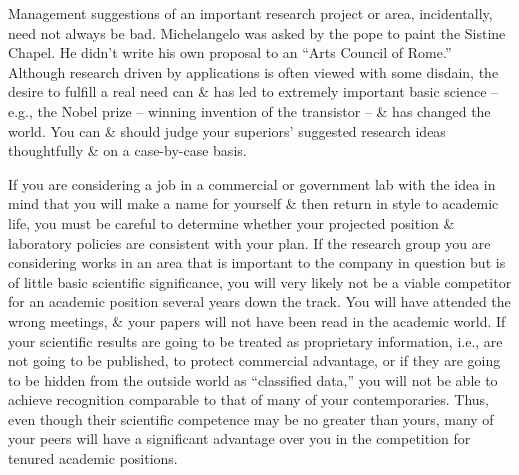 \documentclass{article}
\begin{document}
\begin{enumerate}
\begin{itemize}
\begin{itemize}
			Management suggestions of an important research project or area, incidentally, need not always be bad. Michelangelo was asked by the pope to paint the Sistine Chapel. He didn't write his own proposal to an ``Arts Council of Rome.'' Although research driven by applications is often viewed with some disdain, the desire to fulfill a real need can \& has led to extremely important basic science -- e.g., the Nobel prize -- winning invention of the transistor -- \& has changed the world. You can \& should judge your superiors' suggested research ideas thoughtfully \& on a case-by-case basis.

			If you are considering a job in a commercial or government lab with the idea in mind that you will make a name for yourself \& then return in style to academic life, you must be careful to determine whether your projected position \& laboratory policies are consistent with your plan. If the research group you are considering works in an area that is important to the company in question but is of little basic scientific significance, you will very likely not be a viable competitor for an academic position several years down the track. You will have attended the wrong meetings, \& your papers will not have been read in the academic world. If your scientific results are going to be treated as proprietary information, i.e., are not going to be published, to protect commercial advantage, or if they are going to be hidden from the outside world as ``classified data,'' you will not be able to achieve recognition comparable to that of many of your contemporaries. Thus, even though their scientific competence may be no greater than yours, many of your peers will have a significant advantage over you in the competition for tenured academic positions.


\end{itemize}
\end{itemize}
\end{enumerate}
\end{document}
